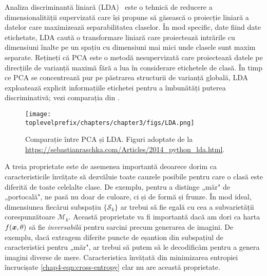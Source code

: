 \documentclass[../../book-main_ro.tex]{subfiles}
\begin{document}
\begin{remark}
    Analiza discriminantă liniară (LDA)~\cite{HastieTiFr09} este o tehnică de reducere a dimensionalității supervizată care își propune să găsească o proiecție liniară a datelor care maximizează separabilitatea claselor. În mod specific, date fiind date etichetate, LDA caută o transformare liniară care proiectează intrările cu dimensiuni înalte pe un spațiu cu dimensiuni mai mici unde clasele sunt maxim separate. Rețineți că PCA este o metodă nesupervizată care proiectează datele pe direcțiile de varianță maximă fără a lua în considerare etichetele de clasă. În timp ce PCA se concentrează pur pe păstrarea structurii de varianță globală, LDA exploatează explicit informațiile etichetei pentru a îmbunătăți puterea discriminativă; vezi comparația din .
\end{remark}

\begin{figure}
	\centering
	\texttt{[image: \\toplevelprefix/chapters/chapter3/figs/LDA.png]}\vspace{-0.1in}
	\caption{Comparație între PCA și LDA. Figuri adoptate de la \url{https://sebastianraschka.com/Articles/2014_python_lda.html}.}
	\label{fig:LDA}
\end{figure}

A treia proprietate este de asemenea importantă deoarece dorim ca caracteristicile învățate să dezvăluie toate cauzele posibile pentru care o clasă este diferită de toate celelalte clase. De exemplu, pentru a distinge „măr" de „portocală", ne pasă nu doar de culoare, ci și de formă și frunze. În mod ideal, dimensiunea fiecărui subspațiu $\{\mathcal{S}_k\}$ ar trebui să fie egală cu cea a subvarietății corespunzătoare $\mathcal{M}_k$. Această proprietate va fi importantă dacă am dori ca harta $f(\bm{x},\theta)$ să fie {\em inversabilă} pentru sarcini precum generarea de imagini. De exemplu, dacă extragem diferite puncte de eșantion din subspațiul de caracteristici pentru „măr", ar trebui să putem să le decodificăm pentru a genera imagini diverse de mere. Caracteristica învățată din minimizarea entropiei încrucișate \eqref{chap4-eqn:cross-entropy} clar nu are această proprietate.
\end{document}
